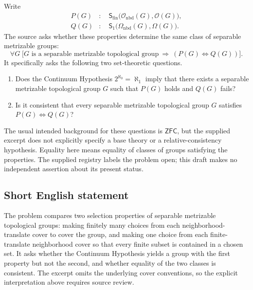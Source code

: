 \documentclass[11pt]{article}
\begin{document}
Write
\[
\begin{aligned}
P(G)&:\quad\mathsf S_{\mathrm{fin}}\bigl(\mathcal O_{\mathrm{nbd}}(G),\mathcal O(G)\bigr),\\
Q(G)&:\quad\mathsf S_1\bigl(\Omega_{\mathrm{nbd}}(G),\Omega(G)\bigr).
\end{aligned}
\]
The source asks whether these properties determine the same class of separable metrizable groups:
\[
\forall G\;\bigl[G\text{ is a separable metrizable topological group}
\ \Longrightarrow\ (P(G)\Longleftrightarrow Q(G))\bigr].
\]
It specifically asks the following two set-theoretic questions.
\begin{enumerate}
\item Does the Continuum Hypothesis \(2^{\aleph_0}=\aleph_1\) imply that there exists a separable metrizable topological group \(G\) such that \(P(G)\) holds and \(Q(G)\) fails?
\item Is it consistent that every separable metrizable topological group \(G\) satisfies \(P(G)\Longleftrightarrow Q(G)\)?
\end{enumerate}
The usual intended background for these questions is \(\mathsf{ZFC}\), but the supplied excerpt does not explicitly specify a base theory or a relative-consistency hypothesis. Equality here means equality of classes of groups satisfying the properties. The supplied registry labels the problem open; this draft makes no independent assertion about its present status.
\subsection{Short English statement}
The problem compares two selection properties of separable metrizable topological groups: making finitely many choices from each neighborhood-translate cover to cover the group, and making one choice from each finite-translate neighborhood cover so that every finite subset is contained in a chosen set. It asks whether the Continuum Hypothesis yields a group with the first property but not the second, and whether equality of the two classes is consistent. The excerpt omits the underlying cover conventions, so the explicit interpretation above requires source review.
\end{document}
